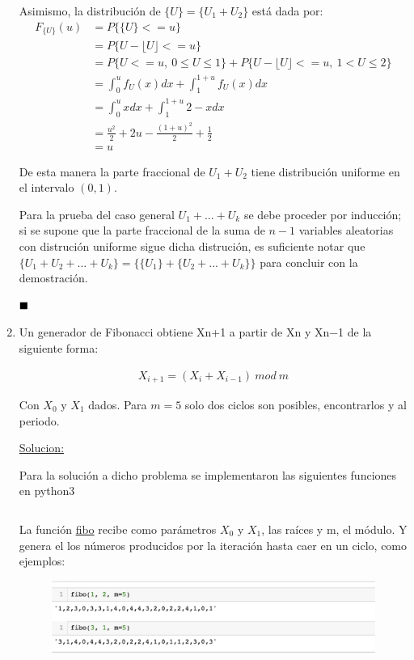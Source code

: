 \documentclass[12 pt]{article}\usepackage[]{graphicx}\usepackage[]{color}
\renewcommand\qedsymbol{$\null\hfill\blacksquare$}
\begin{document}
\begin{enumerate}
    Asimismo, la distribución de $\{U\} = \{U_1 + U_2\}$ está dada por:
    \begin{align*}
        F_{\{U\}}(u) &= P\{ \{U\} <= u\} \\
        &= P\{ U - \lfloor U \rfloor <= u\} \\
        &= P\{ U <= u,\ 0 \leq U \leq 1 \} + P\{ U - \lfloor U \rfloor <= u,\ 1 < U \leq 2 \} \\
        &= \int_0^u f_U(x) dx + \int_1^{1+u} f_U(x) dx \\
        &= \int_0^u x dx + \int_1^{1+u} 2-x dx\\
        &= \frac{u^2}{2} + 2u - \frac{(1+u)^2}{2} + \frac{1}{2}\\
        &= u
    \end{align*}
    
    De esta manera la parte fraccional de $U_1 + U_2$ tiene distribución uniforme en el intervalo $(0,1)$. 
    
    Para la prueba del caso general $U_1 + ... + U_k$ se debe proceder por inducción; si se supone que la parte fraccional de la suma de $n-1$ variables aleatorias con distrución uniforme sigue dicha distrución, es suficiente notar que $\{U_1 + U_2 +... + U_k\} =\{\{U_1\} + \{U_2 + ... + U_k\}\}$ para concluir con la demostración.

    \qedsymbol
    
    
    \newpage
    
    \item Un generador de Fibonacci obtiene Xn+1 a partir de Xn y Xn−1 de la siguiente forma:
    
    \begin{align*}
        X_{i+1} = (X_i + X_{i-1}) \ mod \ m
    \end{align*}
    
    Con $X_0$ y $X_1$ dados. Para $m=5$ solo dos ciclos son posibles, encontrarlos y al periodo.
    
    \underline{Solucion:}
    
    Para la solución a dicho problema se implementaron las siguientes funciones en python3
    
    \inputminted[fontsize=\scriptsize]{python}{fibonacci_generator.py}
    
    La función \underline{fibo} recibe como parámetros $X_0$ y $X_1$, las raíces y m, el módulo. Y genera el los números producidos por la iteración hasta caer en un ciclo, como ejemplos:
    
    \begin{figure}[h]
        \centering
        \includegraphics[width=11cm]{fibonacci.png}
    \end{figure}
    

\end{enumerate}
\end{document}
